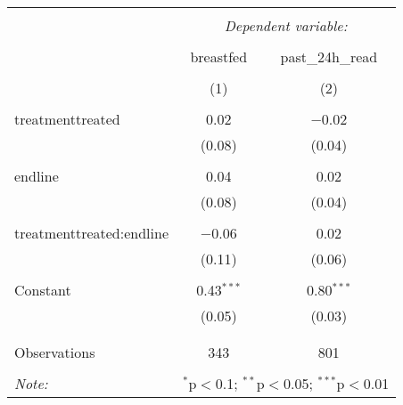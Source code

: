 
\begin{table}[!htbp] \centering 
  \caption{} 
  \label{tbl:regression} 
\begin{tabular}{@{\extracolsep{5pt}}lcc} 
\\[-1.8ex]\hline 
\hline \\[-1.8ex] 
 & \multicolumn{2}{c}{\textit{Dependent variable:}} \\ 
\cline{2-3} 
\\[-1.8ex] & breastfed & past\_24h\_read \\ 
\\[-1.8ex] & (1) & (2)\\ 
\hline \\[-1.8ex] 
 treatmenttreated & 0.02 & $-$0.02 \\ 
  & (0.08) & (0.04) \\ 
  & & \\ 
 endline & 0.04 & 0.02 \\ 
  & (0.08) & (0.04) \\ 
  & & \\ 
 treatmenttreated:endline & $-$0.06 & 0.02 \\ 
  & (0.11) & (0.06) \\ 
  & & \\ 
 Constant & 0.43$^{***}$ & 0.80$^{***}$ \\ 
  & (0.05) & (0.03) \\ 
  & & \\ 
\hline \\[-1.8ex] 
Observations & 343 & 801 \\ 
\hline 
\hline \\[-1.8ex] 
\textit{Note:}  & \multicolumn{2}{r}{$^{*}$p$<$0.1; $^{**}$p$<$0.05; $^{***}$p$<$0.01} \\ 
\end{tabular} 
\end{table} 
